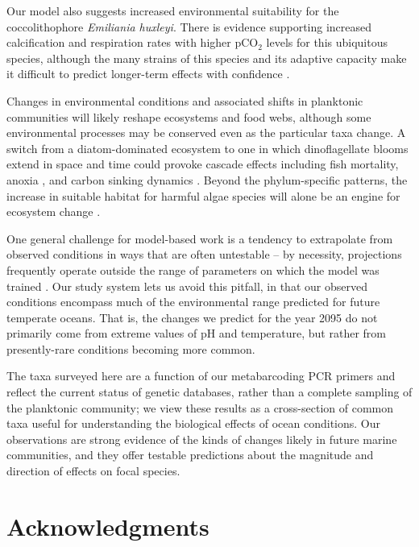 \documentclass[11pt]{article}
\begin{document}
\begin{linenumbers}
 Our model also suggests increased environmental suitability for the coccolithophore \textit{Emiliania huxleyi}. There is evidence supporting increased calcification and respiration rates with higher pCO$_2$ levels \cite{iglesias2008phytoplankton} for this ubiquitous species, although the many strains of this species and its adaptive capacity make it difficult to predict longer-term effects with confidence \cite{bolton2016decrease}. 
 
 Changes in environmental conditions and associated shifts in planktonic communities will likely reshape ecosystems and food webs, although some environmental processes may be conserved even as the particular taxa change. A switch from a diatom-dominated ecosystem to one in which dinoflagellate blooms extend in space and time could provoke cascade effects \cite{xiao2018warming} including fish mortality, anoxia \cite{anderson2002harmful}, and carbon sinking dynamics \cite{bienfang1984sinking}. Beyond the phylum-specific patterns, the increase in suitable habitat for harmful algae species will alone be an engine for ecosystem change \cite{trainer2019pelagic, wells2018harmful}.
  
One general challenge for model-based work is a tendency to extrapolate from observed conditions in ways that are often untestable -- by necessity, projections frequently operate outside the range of parameters on which the model was trained \cite{fitzpatrick2009projection}. Our study system lets us avoid this pitfall, in that our observed conditions encompass much of the environmental range predicted for future temperate oceans. That is, the changes we predict for the year 2095 do not primarily come from extreme values of pH and temperature, but rather from presently-rare conditions becoming more common. 

The taxa surveyed here are a function of our metabarcoding PCR primers \cite{leray_new_2013} and reflect the current status of genetic databases, rather than a complete sampling of the planktonic community; we view these results as a cross-section of common taxa useful for understanding the biological effects of ocean conditions. Our observations are strong evidence of the kinds of changes likely in future marine communities, and they offer testable predictions about the magnitude and direction of effects on focal species. 


\section{Acknowledgments}


\end{linenumbers}
\end{document}
